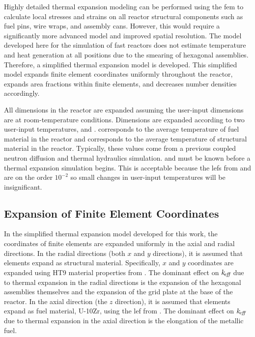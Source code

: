   Highly detailed thermal expansion modeling can be performed using the
  \gls{fem} to calculate local stresses and strains on all reactor
  structural components such as fuel pins, wire wraps, and assembly cans.
  However, this would require a significantly more advanced model and improved
  spatial resolution. The model developed here for the simulation of fast
  reactors does not estimate temperature and heat generation at all positions
  due to the smearing of hexagonal assemblies. Therefore, a simplified thermal
  expansion model is developed.  This simplified model expands finite element
  coordinates uniformly throughout the reactor, expands area fractions within
  finite elements, and decreases number densities accordingly.

  All dimensions in the reactor are expanded assuming the user-input
  dimensions are at room-temperature conditions. Dimensions are expanded
  according to two user-input temperatures, \texpfuel and \texpstruct.
  \texpfuel corresponds to the average temperature of fuel material in the
  reactor and \texpstruct corresponds to the average temperature of structural
  material in the reactor. Typically, these values come from a previous
  coupled neutron diffusion and thermal hydraulics simulation. \texpfuel and
  \texpstruct must be known before a thermal expansion simulation begins. This
  is acceptable because the \glspl{lef} from  and
   are on the order $10^{-2}$ so small changes in
  user-input temperatures will be insignificant.

  \subsection{Expansion of Finite Element Coordinates}
    \label{sec:expansion_of_fe_coordinates}
    In the simplified thermal expansion model developed for this work, the
    coordinates of finite elements are expanded uniformly in the axial and
    radial directions. In the radial directions (both $x$ and $y$ directions),
    it is assumed that elements expand as structural material. Specifically,
    $x$ and $y$ coordinates are expanded using HT9 material properties from
    . The dominant effect on $k_{\!\mbox{\scriptsize \em eff}}$ due to thermal expansion
    in the radial directions is the expansion of the hexagonal assemblies
    themselves and the expansion of the grid plate at the base of the reactor.
    In the axial direction (the $z$ direction), it is assumed that elements
    expand as fuel material, U-10Zr, using the \gls{lef} from
    . The dominant effect on $k_{\!\mbox{\scriptsize \em eff}}$ due to thermal expansion
    in the axial direction is the elongation of the metallic fuel.

